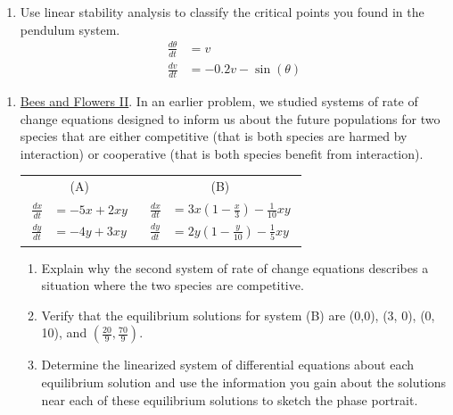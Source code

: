 \begin{enumerate}[resume]
\item Use linear stability analysis to classify the critical points you found in the pendulum system. \label{15problem13}
\begin{align*}
\frac{d\theta}{dt} &=v \\
\frac{dv}{dt} &= -0.2v - \sin(\theta)
\end{align*}
\vfill

\end{enumerate}

\clearpage


\begin{enumerate}
\item \underline{Bees and Flowers II}. In an earlier problem, we studied systems of rate of change equations designed to inform us about the future populations for two species that are either competitive (that is both species are harmed by interaction) or cooperative (that is both species benefit from interaction). \label{15HWproblem1}

\begin{center}
\begin{tabular}{cc}
	 (A)	&	(B)	\\
$\displaystyle \begin{aligned} \frac{dx}{dt} &= -5x+2xy\\ \frac{dy}{dt} &= -4y+3xy \end{aligned}$ &$\displaystyle \begin{aligned} \frac{dx}{dt} &= 3x(1-\frac{x}{3})-\frac{1}{10}xy\\ \frac{dy}{dt} &= 2y(1-\frac{y}{10})-\frac{1}{5}xy \end{aligned}$ 
\end{tabular}
\end{center}

\begin{enumerate}
\item Explain why the second system of rate of change equations describes a situation where the two species are competitive. \label{15HWproblem1parta}
\item Verify that the equilibrium solutions for system (B) are (0,0), (3, 0), (0, 10), and $(\frac{20}{9},\frac{70}{9})$. \label{15HWproblem1partb}
\item Determine the linearized system of differential equations about each equilibrium solution and use the information you gain about the solutions near each of these equilibrium solutions to sketch the phase portrait. \label{15HWproblem1partc}
\end{enumerate}


\end{enumerate}
